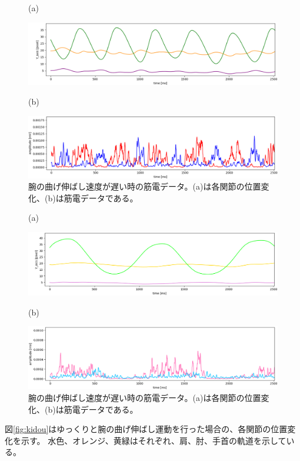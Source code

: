 \documentclass{jsarticle}
\begin{document}
\begin{figure}[htbp]
(a)

\includegraphics[width=17cm]{graph_image/fast_position.png}

(b)	

		\includegraphics[width=17cm]{graph_image/fast_EMG.png}
		\caption{腕の曲げ伸ばし速度が遅い時の筋電データ。(a)は各関節の位置変化、(b)は筋電データである。}
		\label{fig:fast}	

\end{figure}
\clearpage

\begin{figure}[htbp]
(a)

		\includegraphics[width=17cm]{graph_image/slow_position.png}
		\label{fig:slow}

(b)

		\includegraphics[width=17cm]{graph_image/slow_EMG.png}
		\caption{腕の曲げ伸ばし速度が遅い時の筋電データ。(a)は各関節の位置変化、(b)は筋電データである。}
\end{figure}

図\ref{fig:kidou}はゆっくりと腕の曲げ伸ばし運動を行った場合の、各関節の位置変化を示す。
水色、オレンジ、黄緑はそれぞれ、肩、肘、手首の軌道を示している。
\end{document}
